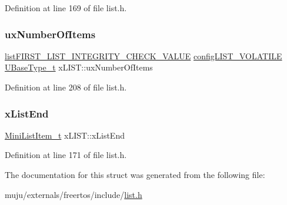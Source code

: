 Definition at line 169 of file list.\+h.

\mbox{\label{structx_l_i_s_t_aa5cb7cdc699e1252af0441e46e427a03}} 
\subsubsection{\texorpdfstring{ux\+Number\+Of\+Items}{uxNumberOfItems}\hspace{0.1cm}{\footnotesize\ttfamily [2/2]}}
{\footnotesize\ttfamily \hyperlink{vendor_2ceedling_2plugins_2freertos_2vendor_2freertos_2include_2list_8h_a3a52b5a4f70d3a07e37a5814a23ba880}{list\+F\+I\+R\+S\+T\+\_\+\+L\+I\+S\+T\+\_\+\+I\+N\+T\+E\+G\+R\+I\+T\+Y\+\_\+\+C\+H\+E\+C\+K\+\_\+\+V\+A\+L\+UE} \hyperlink{vendor_2ceedling_2plugins_2freertos_2vendor_2freertos_2include_2list_8h_a2d5de557c5561c8980d1bf51d87d8cba}{config\+L\+I\+S\+T\+\_\+\+V\+O\+L\+A\+T\+I\+LE} \hyperlink{externals_2freertos_2portable_2_g_c_c_2_a_r_m___c_m0_2portmacro_8h_a646f89d4298e4f5afd522202b11cb2e6}{U\+Base\+Type\+\_\+t} x\+L\+I\+S\+T\+::ux\+Number\+Of\+Items}



Definition at line 208 of file list.\+h.

\mbox{\label{structx_l_i_s_t_a49ad62fa153126e27e273811167b336a}} 
\subsubsection{\texorpdfstring{x\+List\+End}{xListEnd}}
{\footnotesize\ttfamily \hyperlink{externals_2freertos_2include_2list_8h_a542a8d55e98bc407593979e61f83cd02}{Mini\+List\+Item\+\_\+t} x\+L\+I\+S\+T\+::x\+List\+End}



Definition at line 171 of file list.\+h.



The documentation for this struct was generated from the following file\+:\begin{DoxyCompactItemize}
\item 
muju/externals/freertos/include/\hyperlink{externals_2freertos_2include_2list_8h}{list.\+h}\end{DoxyCompactItemize}

